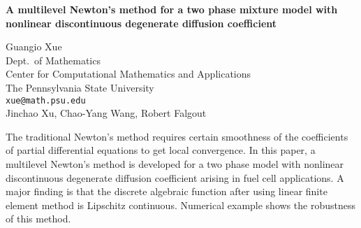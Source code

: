 \documentclass{report}
\begin{document}

\begin{center}
{\large
{\bf A multilevel Newton's method for a two phase mixture model with \\
	nonlinear discontinuous degenerate diffusion coefficient}}

	Guangio Xue \\
	Dept.~of Mathematics \\
	Center for Computational Mathematics and Applications \\
	The Pennsylvania State University \\
	{\tt xue@math.psu.edu} \\
	Jinchao Xu, Chao-Yang Wang, Robert Falgout
\end{center}
The traditional Newton's method requires certain smoothness of
the coefficients of partial differential equations to get local
convergence. In this paper, a multilevel Newton's method is
developed for a two phase model with nonlinear discontinuous
degenerate diffusion coefficient arising in fuel cell
applications. A major finding is that the discrete algebraic
function after using linear finite element method is
Lipschitz continuous.
Numerical example shows the robustness of this method.


\end{document}
